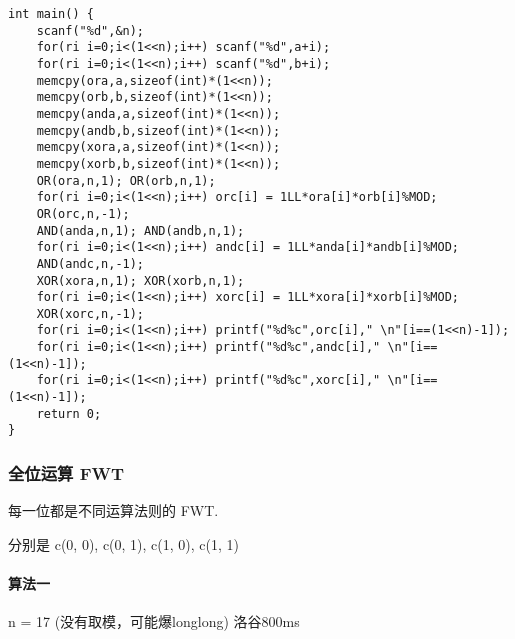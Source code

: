 \documentclass[UTF8]{ctexart}
\begin{document}
\begin{framed}
\begin{lstlisting}
int main() {
    scanf("%d",&n);
    for(ri i=0;i<(1<<n);i++) scanf("%d",a+i);
    for(ri i=0;i<(1<<n);i++) scanf("%d",b+i);
    memcpy(ora,a,sizeof(int)*(1<<n));
    memcpy(orb,b,sizeof(int)*(1<<n));
    memcpy(anda,a,sizeof(int)*(1<<n));
    memcpy(andb,b,sizeof(int)*(1<<n));
    memcpy(xora,a,sizeof(int)*(1<<n));
    memcpy(xorb,b,sizeof(int)*(1<<n));
    OR(ora,n,1); OR(orb,n,1);
    for(ri i=0;i<(1<<n);i++) orc[i] = 1LL*ora[i]*orb[i]%MOD;
    OR(orc,n,-1);
    AND(anda,n,1); AND(andb,n,1);
    for(ri i=0;i<(1<<n);i++) andc[i] = 1LL*anda[i]*andb[i]%MOD;
    AND(andc,n,-1);
    XOR(xora,n,1); XOR(xorb,n,1);
    for(ri i=0;i<(1<<n);i++) xorc[i] = 1LL*xora[i]*xorb[i]%MOD;
    XOR(xorc,n,-1);
    for(ri i=0;i<(1<<n);i++) printf("%d%c",orc[i]," \n"[i==(1<<n)-1]);
    for(ri i=0;i<(1<<n);i++) printf("%d%c",andc[i]," \n"[i==(1<<n)-1]);
    for(ri i=0;i<(1<<n);i++) printf("%d%c",xorc[i]," \n"[i==(1<<n)-1]);
    return 0;
}
\end{lstlisting}
\end{framed}

\subsubsection{全位运算 FWT}

每一位都是不同运算法则的 FWT.

分别是 c(0, 0), c(0, 1), c(1, 0), c(1, 1)

\paragraph{算法一}

n = 17 (没有取模，可能爆longlong) 洛谷800ms
\end{document}
